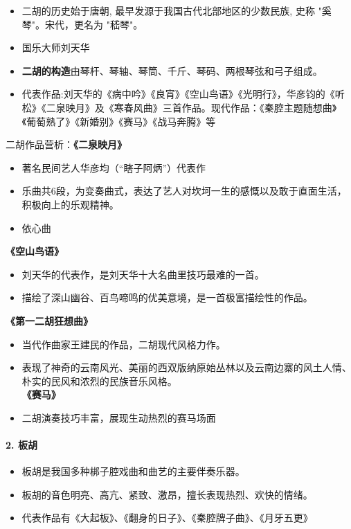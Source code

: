 \documentclass[
]{article}
\providecommand{\tightlist}{%
  \setlength{\itemsep}{0pt}\setlength{\parskip}{0pt}}
\begin{document}
\begin{itemize}
\tightlist
\item
  二胡的历史始于唐朝, 最早发源于我国古代北部地区的少数民族, 史称
  "奚琴"。宋代，更名为 "嵇琴"。
\item
  国乐大师刘天华
\item
  \textbf{二胡的构造}由琴杆、琴轴、琴筒、千斤、琴码、两根琴弦和弓子组成。
\item
  代表作品:刘天华的《病中吟》《良宵》《空山鸟语》《光明行》，华彦钧的《听松》《二泉映月》及《寒春风曲》三首作品。现代作品：《秦腔主题随想曲》《葡萄熟了》《新婚别》《赛马》《战马奔腾》等
\end{itemize}

二胡作品营析：\textbf{《二泉映月》}

\begin{itemize}
\tightlist
\item
  著名民间艺人华彦均（``瞎子阿炳''）代表作
\item
  乐曲共6段，为变奏曲式，表达了艺人对坎坷一生的感慨以及敢于直面生活，积极向上的乐观精神。
\item
  依心曲
\end{itemize}

\textbf{《空山鸟语》}

\begin{itemize}
\tightlist
\item
  刘天华的代表作，是刘天华十大名曲里技巧最难的一首。
\item
  描绘了深山幽谷、百鸟啼鸣的优美意境，是一首极富描绘性的作品。
\end{itemize}

\textbf{《第一二胡狂想曲》}

\begin{itemize}
\tightlist
\item
  当代作曲家王建民的作品，二胡现代风格力作。
\item
  表现了神奇的云南风光、美丽的西双版纳原始丛林以及云南边寨的风土人情、朴实的民风和浓烈的民族音乐风格。\\
  \textbf{《赛马》}
\item
  二胡演奏技巧丰富，展现生动热烈的赛马场面
\end{itemize}

\paragraph{2. 板胡}\label{ux677fux80e1}

\begin{itemize}
\tightlist
\item
  板胡是我国多种梆子腔戏曲和曲艺的主要伴奏乐器。
\item
  板胡的音色明亮、高亢、紧致、激昂，擅长表现热烈、欢快的情绪。
\item
  代表作品有《大起板》、《翻身的日子》、《秦腔牌子曲》、《月牙五更》
\end{itemize}
\end{document}
